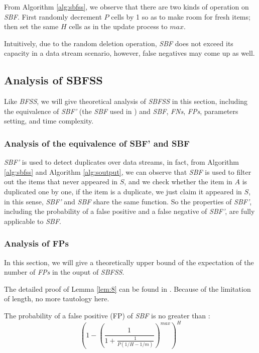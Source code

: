 \documentclass[conference]{IEEEtran}
\begin{document}
From Algorithm \ref{alg:sbfss}, we observe that there are two kinds of operation on \emph{SBF}. First randomly decrement $P$ cells by 1 so as to make room for fresh items; then set the same $H$ cells as in the update process to $max$.\par 
Intuitively, due to the random deletion operation, \emph{SBF} does not exceed its capacity in a data stream scenario, however, false negatives may come up as well.

\subsection{Analysis of SBFSS}
Like \emph{BFSS}, we will give theoretical analysis of \emph{SBFSS} in this section, including the equivalence of \emph{SBF'} (the \emph{SBF} used in \cite{IEEEexample:sbf}) and \emph{SBF}, \emph{FNs}, \emph{FPs}, parameters setting, and time complexity.\par
\subsubsection{\textbf{Analysis of the equivalence of SBF' and SBF}}
\emph{SBF'} is used to detect duplicates over data streams, in fact, from Algorithm \ref{alg:sbfss} and Algorithm \ref{alg:soutput}, we can observe that \emph{SBF} is used to filter out the items that never appeared in $S$, and we check whether the item in $A$ is duplicated one by one, if the item is a duplicate, we just claim it appeared in $S$, in this sense, \emph{SBF'} and \emph{SBF} share the same function. So the properties of \emph{SBF'}, including the probability of a false positive and a false negative of \emph{SBF'}, are fully applicable to \emph{SBF}.\par

\subsubsection{\textbf{Analysis of FPs}}
In this section, we will give a theoretically upper bound of the expectation of the number of \emph{FPs} in the ouput of \emph{SBFSS}.\par
The detailed proof of Lemma \ref{lem:8} can be found in \cite{IEEEexample:sbf}. Because of the limitation of length, no more tautology here.
\begin{lemma}\label{lem:8}
The probability of a false positive (FP) of \emph{SBF} is no greater than :
\begin{equation}
(1-(\frac{1}{1+\frac{1}{P(1/H-1/m)}})^{max})^H
\end{equation}
\end{lemma}
\end{document}

